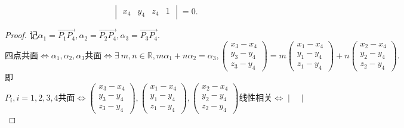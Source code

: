 \documentclass{article}
\begin{document}
\begin{enumerate}
\[\begin{vmatrix}
                x_4 & y_4 & z_4 & 1
            \end{vmatrix}=0.
        \]
        \begin{proof}
            记$\alpha_1=\overrightarrow{P_1 P_4},\alpha_2=\overrightarrow{P_2 P_4},\alpha_3=\overrightarrow{P_3 P_4}$.
            \[
                \mbox{四点共面}
                \Leftrightarrow
                \alpha_1,\alpha_2,\alpha_3 \mbox{共面}
                \Leftrightarrow
                \exists\ m,n\in \mathbb{R},m\alpha_1+n\alpha_2=\alpha_3,
                \begin{pmatrix}
                    x_3-x_4\\
                    y_3-y_4\\
                    z_3-y_4
                \end{pmatrix}
                =m\begin{pmatrix}
                    x_1-x_4\\
                    y_1-y_4\\
                    z_1-y_4
                \end{pmatrix}
                +n\begin{pmatrix}
                    x_2-x_4\\
                    y_2-y_4\\
                    z_2-y_4
                \end{pmatrix}.
            \]
            即
            \[
                P_i,i=1,2,3,4\mbox{共面}
                \Leftrightarrow
                \begin{pmatrix}
                    x_3-x_4\\
                    y_3-y_4\\
                    z_3-y_4
                \end{pmatrix}
                ,\begin{pmatrix}
                    x_1-x_4\\
                    y_1-y_4\\
                    z_1-y_4
                \end{pmatrix}
                ,\begin{pmatrix}
                    x_2-x_4\\
                    y_2-y_4\\
                    z_2-y_4
                \end{pmatrix}
                \mbox{线性相关}
                \Leftrightarrow
                \begin{vmatrix}

\end{vmatrix}\]
\end{proof}
\end{enumerate}
\end{document}
